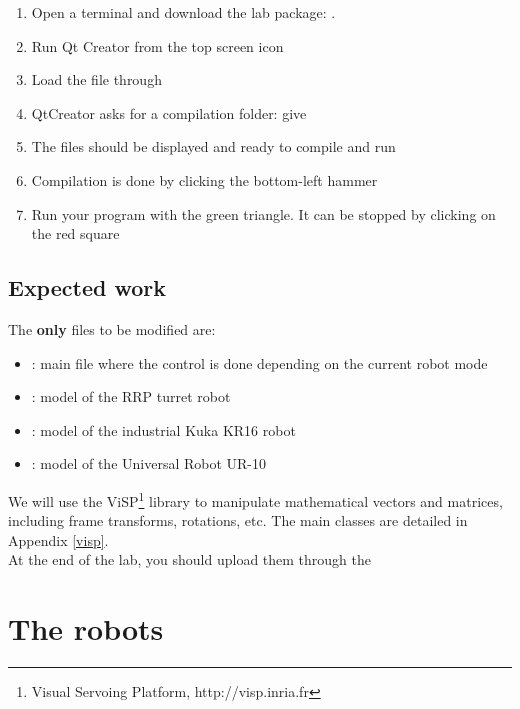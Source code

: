 \documentclass{ecnreport}
\begin{document}
  \begin{enumerate}
    \item Open a terminal and download the lab package: .
    \item Run Qt Creator from the top screen icon
    \item Load the  file through 
    \item QtCreator asks for a compilation folder: give 
    \item The files should be displayed and ready to compile and run
    \item Compilation is done by clicking the bottom-left hammer
    \item Run your program with the green triangle. It can be stopped by clicking on the red square
  \end{enumerate}
  
  \subsection{Expected work}
  
  The {\bf only} files to be modified are:
  \begin{itemize}
    \item {}: main file where the control is done depending on the current robot mode
    \item {}: model of the RRP turret robot
    \item {}: model of the industrial Kuka KR16 robot
    \item {}: model of the Universal Robot UR-10
  \end{itemize}
  We will use the ViSP\footnote{Visual Servoing Platform, http://visp.inria.fr} library to manipulate mathematical vectors and matrices, including frame transforms, rotations, etc. The main classes are detailed in Appendix \ref{visp}.\\
  At the end of the lab, you should upload them through the 
  
  \section{The robots}
  
  \def\wMe{{}^w\M_e}
  
\end{document}
